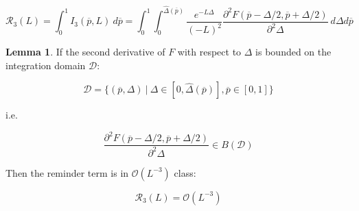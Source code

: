 \documentclass{article}
\theoremstyle{definition}
\newtheorem{lemma}{Lemma}[section]
\begin{document}
\begin{equation}
    \mathcal{R}_3(L)
    =
    \int_0^1 
    I_3(\overline{p},L)
    \  d \overline{p}
    =
    \int_0^1 \int_0^{\hat{\Delta}(\overline{p})}
    \frac{e^{- L \Delta}}{(- L)^2} 
    \frac{\partial^2
    F(\overline{p} - \Delta/2, \overline{p} + \Delta/2) 
    }{\partial^2 \Delta}
    \ d \Delta d \overline{p}
\end{equation}

\begin{lemma}

If the second derivative of $F$ with respect to $\Delta$ is bounded on the integration domain $\mathcal{D}$:

\begin{equation}
    \mathcal{D} = \{ (\overline{p},\Delta) \ | \ \Delta \in [0, \hat{\Delta}(\overline{p})], \overline{p} \in [0, 1] \}
\end{equation}

i.e.

\begin{equation}
    \frac{\partial^2
    F(\overline{p} - \Delta/2, \overline{p} + \Delta/2) 
    }{\partial^2 \Delta}
    \in
    B(\mathcal{D})
\end{equation}

Then the reminder term is in $\mathcal{O}(L^{-3})$ class:

\begin{equation}
    \mathcal{R}_3(L) = \mathcal{O}(L^{-3})
\end{equation}

\end{lemma}
\end{document}
